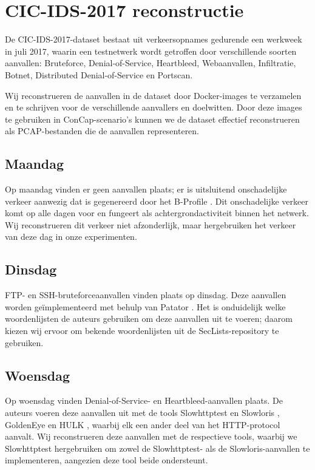 \documentclass[conference]{IEEEtran}
\begin{document}
	\section{CIC-IDS-2017 reconstructie}\label{dataset_reconstruction}
	De CIC-IDS-2017-dataset bestaat uit verkeersopnames gedurende een werkweek in juli 2017, waarin een testnetwerk wordt getroffen door verschillende soorten aanvallen: Bruteforce, Denial-of-Service, Heartbleed, Webaanvallen, Infiltratie, Botnet, Distributed Denial-of-Service en Portscan.
	
	Wij reconstrueren de aanvallen in de dataset door Docker-images te verzamelen en te schrijven voor de verschillende aanvallers en doelwitten. Door deze images te gebruiken in ConCap-scenario’s kunnen we de dataset effectief reconstrueren als PCAP-bestanden die de aanvallen representeren.
	
	\subsection{Maandag}
	Op maandag vinden er geen aanvallen plaats; er is uitsluitend onschadelijke verkeer aanwezig dat is gegenereerd door het B-Profile \cite{b_profile}. Dit onschadelijke verkeer komt op alle dagen voor en fungeert als achtergrondactiviteit binnen het netwerk. Wij reconstrueren dit verkeer niet afzonderlijk, maar hergebruiken het verkeer van deze dag in onze experimenten.
	
	\subsection{Dinsdag}
	FTP- en SSH-bruteforceaanvallen vinden plaats op dinsdag. Deze aanvallen worden geïmplementeerd met behulp van Patator \cite{patator}. Het is onduidelijk welke woordenlijsten de auteurs gebruiken om deze aanvallen uit te voeren; daarom kiezen wij ervoor om bekende woordenlijsten uit de SecLists-repository \cite{seclists} te gebruiken.
	
	\subsection{Woensdag}
	Op woensdag vinden Denial-of-Service- en Heartbleed-aanvallen plaats. De auteurs voeren deze aanvallen uit met de tools Slowhttptest en Slowloris \cite{slowhttptest}, GoldenEye \cite{goldeneye} en HULK \cite{hulk}, waarbij elk een ander deel van het HTTP-protocol aanvalt. Wij reconstrueren deze aanvallen met de respectieve tools, waarbij we Slowhttptest hergebruiken om zowel de Slowhttptest- als de Slowloris-aanvallen te implementeren, aangezien deze tool beide ondersteunt.
	
\end{document}
